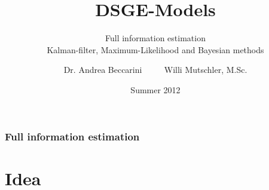 \documentclass{beamer} %
\begin{document}
\author[Willi Mutschler]{Dr. Andrea Beccarini $\qquad$ Willi Mutschler, M.Sc.}
\date{Summer 2012}
\title{DSGE-Models}
\subtitle{Full information estimation\\Kalman-filter, Maximum-Likelihood and Bayesian methods}

\begin{frame}
\titlepage
\end{frame}

\begin{frame}\frametitle{Full information estimation}
\tableofcontents
\end{frame}

\section{Idea}
\end{document}
